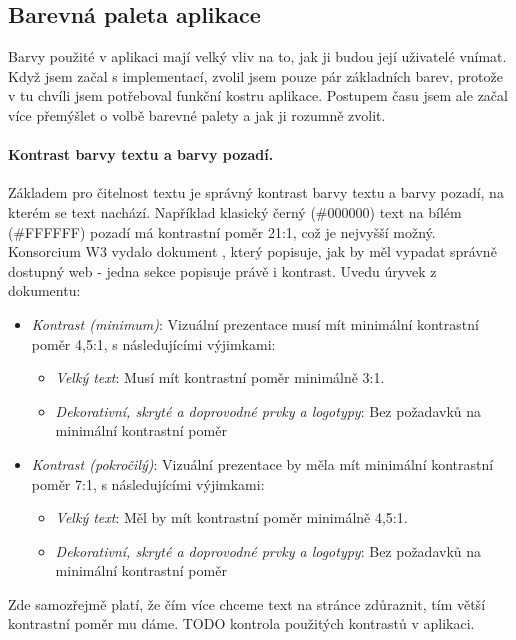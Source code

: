 
\subsection{Barevná paleta aplikace}

Barvy použité v aplikaci mají velký vliv na to, jak ji budou její uživatelé vnímat. Když jsem začal s implementací, zvolil jsem pouze pár základních barev, protože v tu chvíli jsem potřeboval funkční kostru aplikace. Postupem času jsem ale začal více přemýšlet o volbě barevné palety a jak ji rozumně zvolit.

\paragraph{Kontrast barvy textu a barvy pozadí.} Základem pro čitelnost textu je správný kontrast barvy textu a barvy pozadí, na kterém se text nachází. Například klasický černý (\#000000) text na bílém (\#FFFFFF) pozadí má kontrastní poměr 21:1, což je nejvyšší možný. Konsorcium W3 vydalo dokument \cite{w3-access-guide}, který popisuje, jak by měl vypadat správně dostupný web - jedna sekce popisuje právě i kontrast. Uvedu úryvek z dokumentu:
\begin{itemize}
    \item \emph{Kontrast (minimum)}: Vizuální prezentace musí mít minimální kontrastní poměr 4,5:1, s následujícími výjimkami:
    \begin{itemize}
        \item \emph{Velký text}: Musí mít kontrastní poměr minimálně 3:1.
        \item \emph{Dekorativní, skryté a doprovodné prvky a logotypy}: Bez požadavků na minimální kontrastní poměr
    \end{itemize}
    \item \emph{Kontrast (pokročilý)}: Vizuální prezentace by měla mít minimální kontrastní poměr 7:1, s následujícími výjimkami:
    \begin{itemize}
        \item \emph{Velký text}: Měl by mít kontrastní poměr minimálně 4,5:1.
        \item \emph{Dekorativní, skryté a doprovodné prvky a logotypy}: Bez požadavků na minimální kontrastní poměr
    \end{itemize}
\end{itemize}

Zde samozřejmě platí, že čím více chceme text na stránce zdůraznit, tím větší kontrastní poměr mu dáme. TODO kontrola použitých kontrastů v aplikaci.

